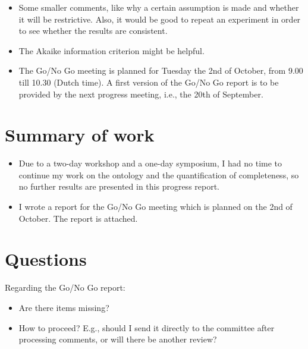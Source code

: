 \documentclass[10pt,final,a4paper,oneside,onecolumn]{article}
\begin{document}
\begin{itemize}
	\item Some smaller comments, like why a certain assumption is made and whether it will be restrictive. Also, it would be good to repeat an experiment in order to see whether the results are consistent.
	
	\item The Akaike information criterion might be helpful.
	
	\item The Go/No Go meeting is planned for Tuesday the 2nd of October, from 9.00 till 10.30 (Dutch time). A first version of the Go/No Go report is to be provided by the next progress meeting, i.e., the 20th of September.
\end{itemize}

\section{Summary of work}

\begin{itemize}
	\item Due to a two-day workshop and a one-day symposium, I had no time to continue my work on the ontology and the quantification of completeness, so no further results are presented in this progress report.
	\item I wrote a report for the Go/No Go meeting which is planned on the 2nd of October. The report is attached.
\end{itemize}

%

\section{Questions}

Regarding the Go/No Go report:
\begin{itemize}
	\item Are there items missing?
	\item How to proceed? E.g., should I send it directly to the committee after processing comments, or will there be another review?
\end{itemize}



\newpage

\end{document}
